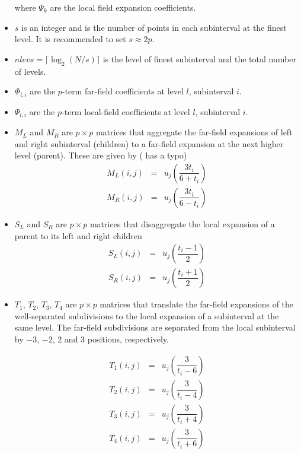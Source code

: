 \begin{itemize}
\noindent where $\Psi_{k}$ are the local field expansion coefficients.

\item $s$ is an integer and is the number of points in each subinterval at the finest level. It is recommended to set $s \approx 2p$.  

\item $nlevs = \lceil \log_2(N/s) \rceil$ is the level of finest subinterval and the total number of levels.  

\item $\Phi_{l,i}$ are the $p$-term far-field coefficients at level $l$, subinterval $i$.

\item $\Psi_{l,i}$ are the $p$-term local-field coefficients at level $l$, subinterval $i$.

\item $M_L$ and $M_R$ are $p \times p$ matrices that aggregate the far-field expansions of left and right subinterval (children) to a far-field expansion at the next higher level (parent).  These are given by (\cite[Eq. 78]{dutt1996fast}  has a typo)
\begin{eqnarray}
M_L(i,j) &=& u_j\left(\dfrac{3 t_i}{6  + t_i}\right) \\
M_R(i,j) &=& u_j\left(\dfrac{3 t_i}{6  - t_i}\right) 
\end{eqnarray}

\item $S_L$ and $S_R$ are $p \times p$ matrices that disaggregate the local expansion of a parent to its left and right children
\begin{eqnarray}
S_L(i,j) &=& u_j\left(\dfrac{t_i -1 }{2}\right) \\
S_R(i,j) &=& u_j\left(\dfrac{t_i + 1}{2}\right) 
\end{eqnarray}

\item $T_1$, $T_2$, $T_3$, $T_4$ are $p \times p$ matrices that translate the far-field expansions of the well-separated subdivisions to the local expansion of a subinterval at the same level.  The far-field subdivisions are separated from the local subinterval by $-3$, $-2$, $2$ and $3$ positions, respectively.  

\begin{eqnarray}
T_1(i,j) &=& u_j\left(\dfrac{3 }{t_i - 6}\right) \\
T_2(i,j) &=& u_j\left(\dfrac{3 }{t_i - 4}\right) \\
T_3(i,j) &=& u_j\left(\dfrac{3 }{t_i + 4}\right) \\
T_4(i,j) &=& u_j\left(\dfrac{3 }{t_i + 6}\right)  \label{fmm1prepeqlast}
\end{eqnarray}

\end{itemize}

